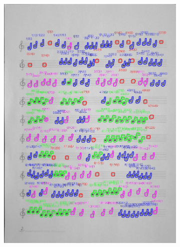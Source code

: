 \documentclass[11pt]{article}
\begin{document}
\begin{figure}[H]
\begin{subfigure}{.45\textwidth}
        \includegraphics[width=\linewidth]{5_cnts.jpg}
        \label{fig:sub2}
    \end{subfigure}
    \label{fig:test}
\end{figure}
\end{document}
